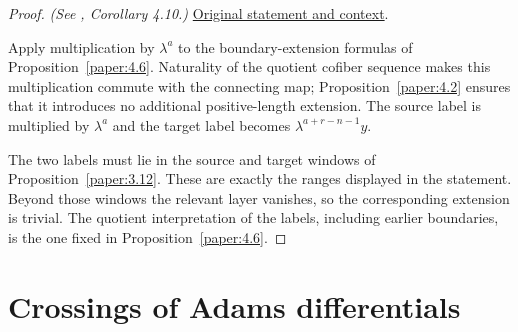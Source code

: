 \begin{proof}
\textit{(See \cite{LWX126}, Corollary 4.10.)} \href{paper/main.tex.html#L1138}{Original statement and context}.

Apply multiplication by $\lambda^a$ to the boundary-extension formulas of Proposition~\ref{paper:4.6}. Naturality of the quotient cofiber sequence makes this multiplication commute with the connecting map; Proposition~\ref{paper:4.2} ensures that it introduces no additional positive-length extension. The source label is multiplied by $\lambda^a$ and the target label becomes $\lambda^{a+r-n-1}y$.

The two labels must lie in the source and target windows of Proposition~\ref{paper:3.12}. These are exactly the ranges displayed in the statement. Beyond those windows the relevant layer vanishes, so the corresponding extension is trivial. The quotient interpretation of the labels, including earlier boundaries, is the one fixed in Proposition~\ref{paper:4.6}.
\end{proof}

\section{Crossings of Adams differentials}

